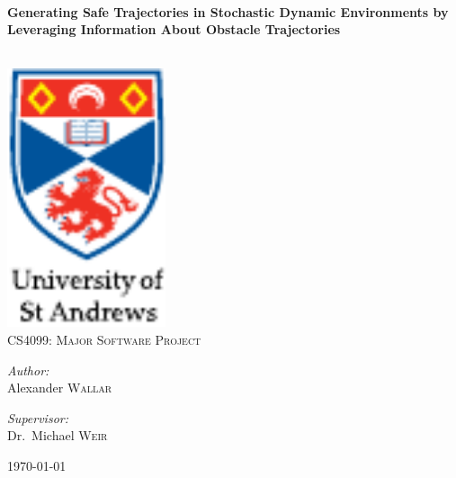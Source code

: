 
\begin{titlepage}

\begin{center}

\HRule \\[0.4cm]
{\huge \bfseries Generating Safe Trajectories in Stochastic Dynamic
    Environments by Leveraging Information About Obstacle Trajectories
\\[0.4cm] }

\HRule \\[3cm]


\includegraphics[width=0.35\textwidth]{figs/st-andrews-logo}~\\[1cm]

\textsc{\Large CS4099: Major Software Project}\\[1cm]

\noindent

\begin{minipage}{0.3\textwidth}

\begin{center} \large

\emph{Author:}\\

Alexander \textsc{Wallar}

\end{center}

\end{minipage}%
\begin{minipage}{0.3\textwidth}

\begin{center} \large

\emph{Supervisor:} \\

Dr.~Michael \textsc{Weir}

\end{center}

\end{minipage}%

\vfill

{\large \today}

\end{center}

\end{titlepage}
